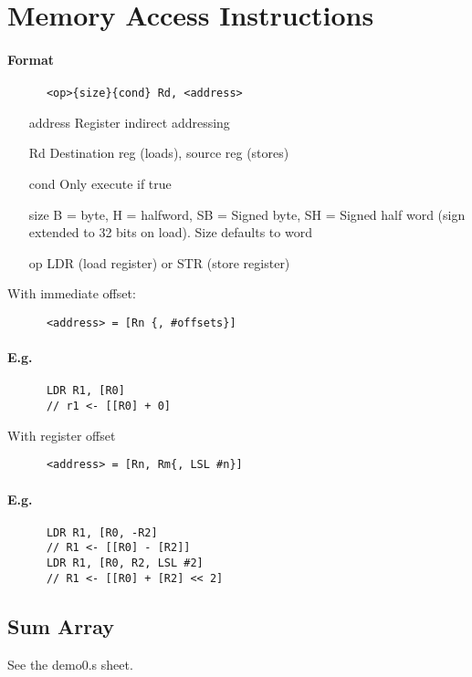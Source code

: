   \section{Memory Access Instructions}
    \paragraph{Format}
    \begin{lstlisting}
      <op>{size}{cond} Rd, <address>
    \end{lstlisting}
    \begin{itemize}
      \item[address] Register indirect addressing
      \item[Rd] Destination reg (loads), source reg (stores)
      \item[cond] Only execute if true
      \item[size] B = byte, H = halfword, SB = Signed byte, SH = Signed half
      word (sign extended to 32 bits on load). Size defaults to word
      \item[op] LDR (load register) or STR (store register)
    \end{itemize}
    With immediate offset:
    \begin{lstlisting}
      <address> = [Rn {, #offsets}]
    \end{lstlisting}
    \paragraph{E.g.}
    \begin{lstlisting}
      LDR R1, [R0]
      // r1 <- [[R0] + 0]
    \end{lstlisting}
    With register offset
    \begin{lstlisting}
      <address> = [Rn, Rm{, LSL #n}]
    \end{lstlisting}
    \paragraph{E.g.}
    \begin{lstlisting}
      LDR R1, [R0, -R2]
      // R1 <- [[R0] - [R2]]
      LDR R1, [R0, R2, LSL #2]
      // R1 <- [[R0] + [R2] << 2]
    \end{lstlisting}

  \subsection{Sum Array}
    See the demo0.s sheet.

